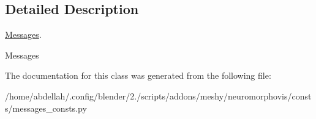 \subsection{Detailed Description}
\hyperlink{classmeshy_1_1neuromorphovis_1_1consts_1_1messages__consts_1_1Messages}{Messages}. 

\begin{DoxyVerb}Messages
\end{DoxyVerb}
 

The documentation for this class was generated from the following file\+:\begin{DoxyCompactItemize}
\item 
/home/abdellah/.\+config/blender/2./scripts/addons/meshy/neuromorphovis/consts/messages\+\_\+consts.\+py\end{DoxyCompactItemize}
